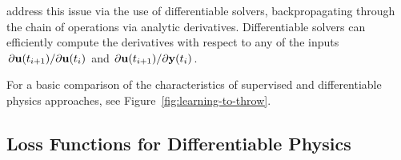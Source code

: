 \cite{holl2019pdecontrol} address this issue via the use of differentiable
solvers, backpropagating through the chain of operations via analytic
derivatives.  Differentiable solvers can efficiently compute the derivatives
with respect to any of the inputs $\pdv*{\vb{u}(t_{i+1})}{\vb{u}(t_i)}$ and
$\pdv*{\vb{u}(t_{i+1})}{\vb{y}(t_i)}$. 


For a basic comparison of the characteristics of supervised and differentiable
physics approaches, see Figure~\ref{fig:learning-to-throw}.


\subsection{Loss Functions for Differentiable Physics}
\label{dp-loss}



